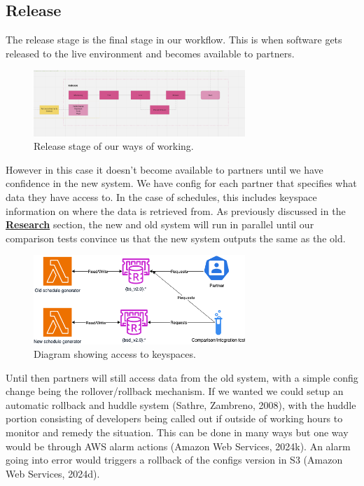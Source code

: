   \subsection{Release}
  The release stage is the final stage in our workflow. This is when software gets released to the live environment and becomes available to partners. 
  \begin{figure}[H]
    \centering
    \includegraphics[width=8cm]{assets/workflow/release.png}
    \caption{Release stage of our ways of working.}
    \label{fig:workflowRelease}
  \end{figure}
  
  However in this case it doesn't become available to partners until we have confidence in the new system. We have config for each partner that 
  specifies what data they have access to. In the case of schedules, this includes keyspace information on where the data is retrieved from. As 
  previously discussed in the \hyperref[sec:cicd]{\textbf{Research}} section, the new and old system will run in parallel until our comparison tests 
  convince us that the new system outputs the same as the old.

  \begin{figure}[H]
    \centering
    \includegraphics[width=8cm]{assets/keyspaceAccess.drawio.png}
    \caption{Diagram showing access to keyspaces.}
    \label{fig:keySpaceAccess}
  \end{figure}

  Until then partners will still access data from the old system, with a simple config change being the rollover/rollback mechanism. If we wanted we 
  could setup an automatic rollback and huddle system (Sathre, Zambreno, 2008), with the huddle portion consisting of developers being called out if 
  outside of working hours to monitor and remedy the situation. This can be done in many ways but one way would be through AWS alarm 
  actions (Amazon Web Services, 2024k). An alarm going into error would  triggers a rollback of the configs version in S3 (Amazon Web Services, 2024d).

